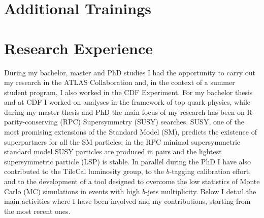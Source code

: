 \documentclass[11pt,a4paper]{moderncv}
\begin{document}
\section{Additional Trainings}

\section{Research Experience}
During my bachelor, master and PhD studies I had the opportunity to carry out my research in the ATLAS Collaboration and, in the context of a summer student program, I also worked in the CDF Experiment. 
For my bachelor thesis and at CDF I worked on analyses in the framework of top quark physics, while during my master thesis and PhD the main focus of my research has been on R-parity-conserving (RPC) Supersymmetry (SUSY) searches. SUSY, one of the most promising extensions of the Standard Model (SM), predicts the existence of superpartners for all the SM particles; in the RPC minimal supersymmetric standard model SUSY particles are produced in pairs and the lightest supersymmetric particle (LSP) is stable. In parallel during the PhD I have also contributed to the TileCal luminosity group, to the $b$-tagging calibration effort, and to the development of a tool designed to overcome the low statistics of Monte Carlo (MC) simulations in events with high $b$-jets multiplicity. Below I detail the main activities where I have been involved and my contributions, starting from the most recent ones.
\end{document}

